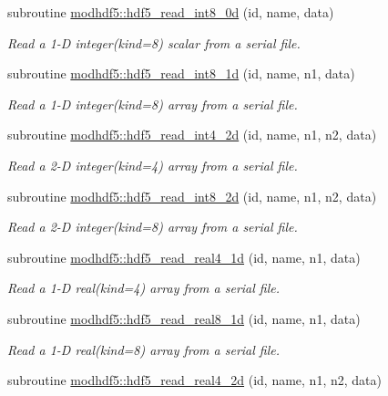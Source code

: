 \begin{DoxyCompactItemize}
subroutine \hyperlink{namespacemodhdf5_ac60e719f8d357b8ffab4f183a7ca4603}{modhdf5\+::hdf5\+\_\+read\+\_\+int8\+\_\+0d} (id, name, data)
\begin{DoxyCompactList}\small\item\em Read a 1-\/D integer(kind=8) scalar from a serial file. \end{DoxyCompactList}\item 
subroutine \hyperlink{namespacemodhdf5_a640df6ccea7f28d6ed6b578d8018d7d7}{modhdf5\+::hdf5\+\_\+read\+\_\+int8\+\_\+1d} (id, name, n1, data)
\begin{DoxyCompactList}\small\item\em Read a 1-\/D integer(kind=8) array from a serial file. \end{DoxyCompactList}\item 
subroutine \hyperlink{namespacemodhdf5_a29f383042b1dc2b1fc1155af48fc98a3}{modhdf5\+::hdf5\+\_\+read\+\_\+int4\+\_\+2d} (id, name, n1, n2, data)
\begin{DoxyCompactList}\small\item\em Read a 2-\/D integer(kind=4) array from a serial file. \end{DoxyCompactList}\item 
subroutine \hyperlink{namespacemodhdf5_a4ac00fa4fbae4c8a8f936ee48292e114}{modhdf5\+::hdf5\+\_\+read\+\_\+int8\+\_\+2d} (id, name, n1, n2, data)
\begin{DoxyCompactList}\small\item\em Read a 2-\/D integer(kind=8) array from a serial file. \end{DoxyCompactList}\item 
subroutine \hyperlink{namespacemodhdf5_ae087ad5b47b31640a477e5056aaf97e9}{modhdf5\+::hdf5\+\_\+read\+\_\+real4\+\_\+1d} (id, name, n1, data)
\begin{DoxyCompactList}\small\item\em Read a 1-\/D real(kind=4) array from a serial file. \end{DoxyCompactList}\item 
subroutine \hyperlink{namespacemodhdf5_a584fb8f065f2c6675049794e856b5085}{modhdf5\+::hdf5\+\_\+read\+\_\+real8\+\_\+1d} (id, name, n1, data)
\begin{DoxyCompactList}\small\item\em Read a 1-\/D real(kind=8) array from a serial file. \end{DoxyCompactList}\item 
subroutine \hyperlink{namespacemodhdf5_a36acd2df481965d7cb9c1b312fdff7b0}{modhdf5\+::hdf5\+\_\+read\+\_\+real4\+\_\+2d} (id, name, n1, n2, data)

\end{DoxyCompactItemize}
